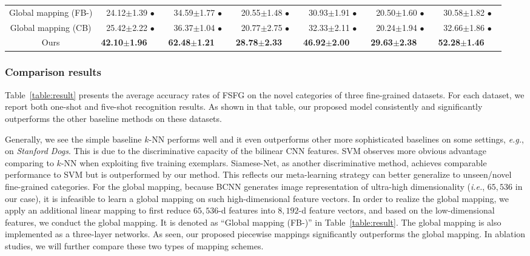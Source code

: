 \documentclass[10pt,twocolumn,letterpaper]{article}
\begin{document}
\begin{table*}[t]
\begin{tabular}{|c|c|c|c|c|c|c|}
  Global mapping (FB-) &    24.12{\scriptsize$\pm$1.39} $\bullet$  &   34.59{\scriptsize$\pm$1.77} $\bullet$ &  20.55{\scriptsize$\pm$1.48} $\bullet$  &  30.93{\scriptsize$\pm$1.91} $\bullet$  &  20.50{\scriptsize$\pm$1.60} $\bullet$  &   30.58{\scriptsize$\pm$1.82} $\bullet$  \\
  Global mapping (CB) &  25.42{\scriptsize$\pm$2.22} $\bullet$  &   36.37{\scriptsize$\pm$1.04} $\bullet$ &  20.77{\scriptsize$\pm$2.75} $\bullet$  &  32.33{\scriptsize$\pm$2.11} $\bullet$  &  20.24{\scriptsize$\pm$1.94} $\bullet$  &   32.66{\scriptsize$\pm$1.86} $\bullet$  \\
  \hline
  \hline
  Ours & \textbf{42.10{\scriptsize$\pm$1.96}}~~~    &  \textbf{62.48{\scriptsize$\pm$1.21}}~~~  & \textbf{28.78{\scriptsize$\pm$2.33}}~~~   &  \textbf{46.92{\scriptsize$\pm$2.00}}~~~  &  \textbf{29.63{\scriptsize$\pm$2.38}}~~~  &   \textbf{52.28{\scriptsize$\pm$1.46}}~~~  \\
  \hline
 \end{tabular}
\end{table*}

\subsubsection{Comparison results}

Table~\ref{table:result} presents the average accuracy rates of FSFG on the novel categories of three fine-grained datasets. For each dataset, we report both one-shot and five-shot recognition results. As shown in that table, our proposed model consistently and significantly outperforms the other baseline methods on these datasets.

Generally, we see the simple baseline $k$-NN performs well and it even outperforms other more sophisticated baselines on some settings, \emph{e.g.}, on \emph{Stanford Dogs}. This is due to the discriminative capacity of the bilinear CNN features. SVM observes more obvious advantage comparing to $k$-NN when exploiting five training exemplars. Siamese-Net, as another discriminative method, achieves comparable performance to SVM but is outperformed by our method. This reflects our meta-learning strategy can better generalize to unseen/novel fine-grained categories. For the global mapping, because BCNN generates image representation of ultra-high dimensionality (\emph{i.e.}, $65,536$ in our case), it is infeasible to learn a global mapping on such high-dimensional feature vectors. In order to realize the global mapping, we apply an additional linear mapping to first reduce $65,536$-d features into $8,192$-d feature vectors, and based on the low-dimensional features, we conduct the global mapping. It is denoted as ``Global mapping (FB-)'' in Table~\ref{table:result}. The global mapping is also implemented as a three-layer networks. As seen, our proposed piecewise mappings significantly outperforms the global mapping. In ablation studies, we will further compare these two types of mapping schemes. 
\end{document}

